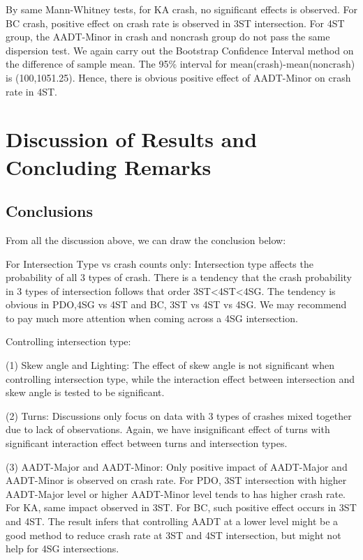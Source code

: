 \documentclass[11pt]{scrartcl} %
\begin{document}
By same Mann-Whitney tests, for KA crash, no significant effects is observed. For BC crash, positive effect on crash rate is observed in 3ST intersection. For 4ST group, the AADT-Minor in crash and noncrash group do not pass the same dispersion test. We again carry out the Bootstrap Confidence Interval method on the difference of sample mean. The 95\% interval for mean(crash)-mean(noncrash) is (100,1051.25). Hence, there is obvious positive effect of AADT-Minor on crash rate in 4ST.

\section{Discussion of Results and Concluding Remarks}

\subsection{Conclusions}

From all the discussion above, we can draw the conclusion below:

For Intersection Type vs crash counts only: Intersection type affects the probability of all 3 types of crash. There is a tendency that the crash probability in 3 types of intersection follows that order 3ST<4ST<4SG. The tendency is obvious in PDO,4SG vs 4ST and BC, 3ST vs 4ST vs 4SG. We may recommend to pay much more attention when coming across a 4SG intersection.

Controlling intersection type:

(1) Skew angle and Lighting: The effect of skew angle is not significant when controlling intersection type, while the interaction effect between intersection and skew angle is tested to be significant.

(2) Turns: Discussions only focus on data with 3 types of crashes mixed together due to lack of observations. Again, we have insignificant effect of turns with significant interaction effect between turns and intersection types.

(3) AADT-Major and AADT-Minor: Only positive impact of AADT-Major and AADT-Minor is observed on crash rate. For PDO, 3ST intersection with higher AADT-Major level or higher AADT-Minor level tends to has higher crash rate. For KA, same impact observed in 3ST. For BC, such positive effect occurs in 3ST and 4ST. The result infers that controlling AADT at a lower level might be a good method to reduce crash rate at 3ST and 4ST intersection, but might not help for 4SG intersections.
\end{document}
